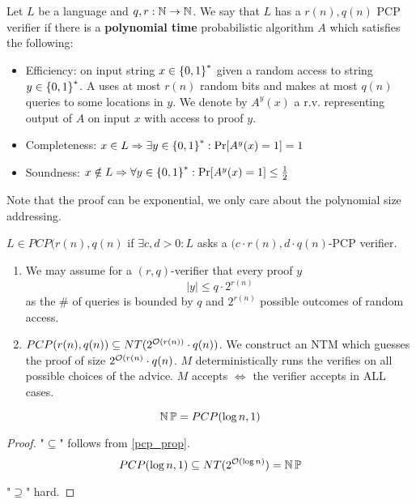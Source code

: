 \begin{definition}
	Let $L$ be a language and $q, r:\operatorname{\mathbb{N}} \to \operatorname{\mathbb{N}}$.
	We say that $L$  has a $r(n), q(n)$ PCP verifier if there is a \textbf{polynomial time} probabilistic algorithm $A$ which satisfies the following:
	\begin{itemize}
		\item Efficiency: on input string $x \in \operatorname{\{ 0, 1 \}}^{\ast}$ given a random access to string $y \in \operatorname{\{ 0, 1 \}}^{\ast}$. A uses at most $r(n)$ random bits and makes at most $q(n)$ queries to some locations in $y$.
		We denote by $A^y(x)$ a r.v. representing output of $A$ on input $x$ with access to proof $y$.
	\item Completeness: $x \in L \Rightarrow \exists y \in \operatorname{\{ 0, 1 \}}^{\ast}: \operatorname{Pr}[A^y(x) = 1] = 1$
	\item Soundness: $x \notin L \Rightarrow \forall y \in \operatorname{\{ 0, 1 \}}^{\ast}: \operatorname{Pr}[A^y(x) = 1] \leq \frac{1}{2}$
	\end{itemize}

	Note that the proof can be exponential, we only care about the polynomial size addressing.
\end{definition}

\begin{definition}
	$L \in PCP(r(n), q(n)$ if $\exists c, d > 0: L$ asks a $(c \cdot r(n), d \cdot q(n)$-PCP verifier.
\end{definition}

\begin{lemma}\label{pcp_prop}
	\begin{enumerate}
		\item We may assume for a $(r, q)$-verifier that every proof $y$
			\[ |y| \leq q \cdot 2^{r(n)} \]
			as the \# of queries is bounded by $q$ and $2^{r(n)}$ possible outcomes of random access.
		\item $PCP(r(n), q(n)) \subseteq NT(2^{\mathcal{O}(r(n))} \cdot q(n))$.
			We construct an NTM which guesses the proof of size $2^{\mathcal{O}(r(n)} \cdot q(n)$.
			$M$ deterministically runs the verifies on all possible choices of the advice.
			$M$ accepts $\iff$ the verifier accepts in ALL cases.
	\end{enumerate}
\end{lemma}

\begin{theorem}[PCP]\label{pcp}
	\[ \operatorname{\operatorname{\mathbb{N}}\mathbb{P}} = PCP (\log n, 1) \]
\end{theorem}
\begin{proof}
	"$\subseteq$" follows from \cref{pcp_prop}.
	\[ PCP (\log n, 1) \subseteq NT(2^{\mathcal{O}(\log n)}) = \operatorname{\operatorname{\mathbb{N}}\mathbb{P}} \]

	"$\supseteq$" hard.
\end{proof}

